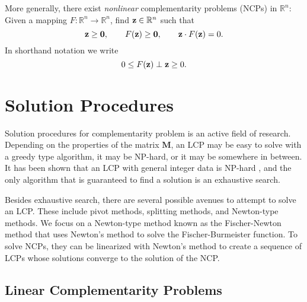 More generally, there exist \emph{nonlinear} complementarity problems (NCPs) in $\mathbb{R}^n$: Given a mapping $F:\mathbb{R}^n\to\mathbb{R}^n$,  find ${\mathbf{z}}\in \mathbb{R}^n$ such that
\begin{equation} \label{eq:ncp}{\mathbf{z}} \geq \mathbf{0}, \qquad F({\mathbf{z}}) \geq  \mathbf{0}, \qquad {\mathbf{z}}\cdot F({\mathbf{z}}) = 0.\end{equation}
In shorthand notation we write
\[ 0 \leq F({\mathbf{z}}) \perp {\mathbf{z}}\geq 0.\]

\section{Solution Procedures}

Solution procedures for complementarity problem is an active field of research. Depending on the properties of the matrix $\mathbf{M}$, an LCP may be easy to solve with a greedy type algorithm, it may be NP-hard, or it may be somewhere in between. It has been shown that an LCP with general integer data is NP-hard \cite{Murty1988}, and the only algorithm that is guaranteed to find a solution is an exhaustive search. 

Besides exhaustive search, there are several possible avenues to attempt to solve an LCP. These include pivot methods, splitting methods, and Newton-type methods. We focus on a Newton-type method known as the Fischer-Newton method that uses Newton's method to solve the Fischer-Burmeister function. To solve NCPs, they can be linearized with Newton's method to create a sequence of LCPs whose solutions converge to the solution of the NCP.

\subsection{Linear Complementarity Problems}


